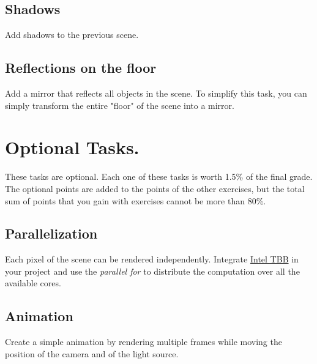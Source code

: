 \documentclass[11pt]{article}
\begin{document}
\subsection{Shadows}

Add shadows to the previous scene.

\subsection{Reflections on the floor}

Add a mirror that reflects all objects in the scene. 
To simplify this task, you can simply transform the entire "floor" of the scene into a mirror.

\section*{Optional Tasks.}

These tasks are optional. Each one of these tasks is worth 1.5\% of the final grade. The optional points are added to the points of the other exercises, but the total sum of points that you gain with exercises cannot be more than 80\%.

\subsection{Parallelization}

Each pixel of the scene can be rendered independently. Integrate \href{https://www.threadingbuildingblocks.org}{Intel TBB} in your project and use the \textit{parallel for} to distribute the computation over all the available cores.

\subsection{Animation}

Create a simple animation by rendering multiple frames while moving the position of the camera and of the light source.

%
%
\end{document}
